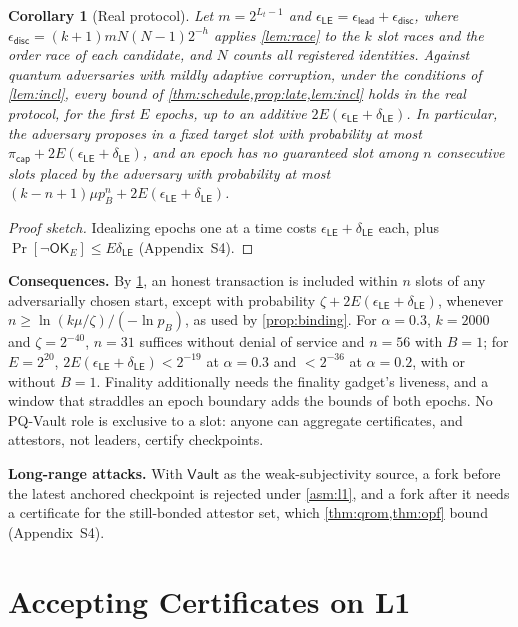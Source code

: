 \documentclass[10pt,journal,compsoc]{IEEEtran}
\theoremstyle{tplain}
\newtheorem{corollary}[theorem]{Corollary}
\theoremstyle{tdef}
\theoremstyle{remark}
\newcommand{\supp}[1]{Appendix~#1}
\newcommand{\Vault}{\mathsf{Vault}}
\begin{document}
\begin{corollary}[Real protocol]\label{cor:real}
Let $m=2^{L_t-1}$ and $\epsilon_{\mathsf{LE}}=\epsilon_{\mathsf{lead}}+\epsilon_{\mathsf{disc}}$, where $\epsilon_{\mathsf{disc}}=(k+1)mN(N-1)2^{-h}$ applies \cref{lem:race} to the $k$ slot races and the order race of each candidate, and $N$ counts all registered identities. Against quantum adversaries with mildly adaptive corruption, under the conditions of \cref{lem:incl}, every bound of \cref{thm:schedule,prop:late,lem:incl} holds in the real protocol, for the first $E$ epochs, up to an additive $2E(\epsilon_{\mathsf{LE}}+\delta_{\mathsf{LE}})$. In particular, the adversary proposes in a fixed target slot with probability at most $\pi_{\mathsf{cap}}+2E(\epsilon_{\mathsf{LE}}+\delta_{\mathsf{LE}})$, and an epoch has no guaranteed slot among $n$ consecutive slots placed by the adversary with probability at most $(k-n+1)\mu p_B^{n}+2E(\epsilon_{\mathsf{LE}}+\delta_{\mathsf{LE}})$.
\end{corollary}
\begin{proof}[Proof sketch]
Idealizing epochs one at a time costs $\epsilon_{\mathsf{LE}}+\delta_{\mathsf{LE}}$ each, plus $\Pr[\neg\mathsf{OK}_E]\le E\delta_{\mathsf{LE}}$ (\supp{S4}).
\end{proof}

\noindent\textbf{Consequences.} By \cref{cor:real}, an honest transaction is included within $n$ slots of any adversarially chosen start, except with probability $\zeta+2E(\epsilon_{\mathsf{LE}}+\delta_{\mathsf{LE}})$, whenever $n\ge\ln(k\mu/\zeta)/(-\ln p_B)$, as used by \cref{prop:binding}. For $\alpha=0.3$, $k=2000$ and $\zeta=2^{-40}$, $n=31$ suffices without denial of service and $n=56$ with $B=1$; for $E=2^{20}$, $2E(\epsilon_{\mathsf{LE}}+\delta_{\mathsf{LE}})<2^{-19}$ at $\alpha=0.3$ and $<2^{-36}$ at $\alpha=0.2$, with or without $B=1$. Finality additionally needs the finality gadget's liveness, and a window that straddles an epoch boundary adds the bounds of both epochs. No PQ-Vault role is exclusive to a slot: anyone can aggregate certificates, and attestors, not leaders, certify checkpoints.

\noindent\textbf{Long-range attacks.} With $\Vault$ as the weak-subjectivity source, a fork before the latest anchored checkpoint is rejected under \cref{asm:l1}, and a fork after it needs a certificate for the still-bonded attestor set, which \cref{thm:qrom,thm:opf} bound (\supp{S4}).

\section{Accepting Certificates on L1}\label{sec:opf}
\end{document}
